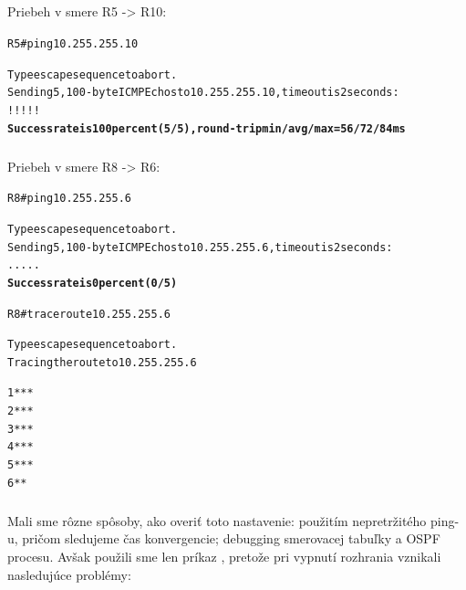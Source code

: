 \documentclass[12pt,twoside,a4paper]{article}
\begin{document}
\subparagraph{}
Priebeh  v smere R5 -\textgreater{} R10:

\noindent
{\selectfont
\begin{small}
\begin{alltt}

R5#ping 10.255.255.10

Type escape sequence to abort.
Sending 5, 100-byte ICMP Echos to 10.255.255.10, timeout is 2 seconds:
!!!!!
\textbf{Success rate is 100 percent (5/5), round-trip min/avg/max = 56/72/84 ms}

\end{alltt}
\end{small}
}


\subparagraph{}
Priebeh  v smere R8 -\textgreater{} R6:

\noindent
{\selectfont
\begin{small}
\begin{alltt}

R8#ping 10.255.255.6

Type escape sequence to abort.
Sending 5, 100-byte ICMP Echos to 10.255.255.6, timeout is 2 seconds:
.....
\textbf{Success rate is 0 percent (0/5)}





R8#traceroute 10.255.255.6

Type escape sequence to abort.
Tracing the route to 10.255.255.6

  1  *  *  * 
  2  *  *  * 
  3  *  *  * 
  4  *  *  * 
  5  *  *  * 
  6  *  * 

\end{alltt}
\end{small}
}

\subparagraph{}
Mali sme rôzne spôsoby, ako overiť toto nastavenie: použitím nepretržitého ping-u, pričom sledujeme čas konvergencie; debugging smerovacej tabuľky a OSPF procesu. Avšak použili sme len príkaz , pretože pri vypnutí rozhrania  vznikali nasledujúce problémy:
\end{document}
